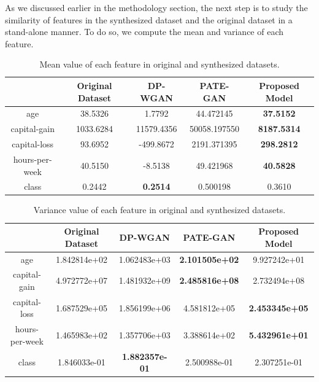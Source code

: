 \documentclass{article}
\begin{document}
As we discussed earlier in the methodology section, the next step is to study the similarity of features in the synthesized dataset and the original dataset in a stand-alone manner. To do so, we compute the mean and variance of each feature.
           
\begin{table}[ht]
    \centering
    \begin{tabular}{||c |c c c c||}
        \hline
        & Original Dataset & DP-WGAN & PATE-GAN & Proposed Model \\ [0.5ex] 
        \hline\hline
        age             & 38.5326   & 1.7792            & 44.472145     & \textbf{37.5152} \\ 
        capital-gain    & 1033.6284 & 11579.4356        & 50058.197550  & \textbf{8187.5314} \\
        capital-loss    & 93.6952   & -499.8672         & 2191.371395   & \textbf{298.2812} \\
        hours-per-week  & 40.5150   & -8.5138           & 49.421968     & \textbf{40.5828} \\
        class           & 0.2442    & \textbf{0.2514}   & 0.500198      & 0.3610 \\ [1ex] 
        \hline
    \end{tabular}
    \caption{Mean value of each feature in original and synthesized datasets.}
    \label{table:mean}
\end{table}

\begin{table}[ht]
    \centering
    \begin{tabular}{||c |c c c c||}
        \hline
        & Original Dataset & DP-WGAN & PATE-GAN & Proposed Model \\ [0.5ex] 
        \hline\hline
        age             & 1.842814e+02  & 1.062483e+03  & \textbf{2.101505e+02} & 9.927242e+01 \\ 
        capital-gain    & 4.972772e+07  & 1.481932e+09  & \textbf{2.485816e+08} & 2.732494e+08 \\
        capital-loss    & 1.687529e+05  & 1.856199e+06  & 4.581812e+05      & \textbf{2.453345e+05} \\
        hours-per-week  & 1.465983e+02  & 1.357706e+03  & 3.388614e+02      & \textbf{5.432961e+01} \\
        class           & 1.846033e-01  & \textbf{1.882357e-01}  & 2.500988e-01      & 2.307251e-01 \\ [1ex] 
        \hline
    \end{tabular}
    \caption{Variance value of each feature in original and synthesized datasets.}
    \label{table:variance}
\end{table}
\end{document}
